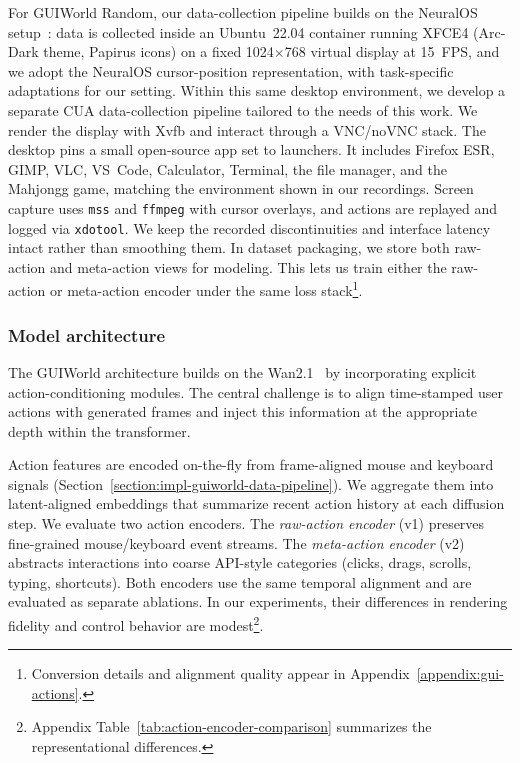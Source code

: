 For GUIWorld Random, our data-collection pipeline builds on the NeuralOS setup~\citep{rivard2025neuralos}: data is collected inside an Ubuntu~22.04 container running XFCE4 (Arc-Dark theme, Papirus icons) on a fixed 1024$\times$768 virtual display at 15~FPS, and we adopt the NeuralOS cursor-position representation, with task-specific adaptations for our setting.
Within this same desktop environment, we develop a separate CUA data-collection pipeline tailored to the needs of this work.
We render the display with Xvfb and interact through a VNC/noVNC stack.
The desktop pins a small open-source app set to launchers.
It includes Firefox ESR, GIMP, VLC, VS~Code, Calculator, Terminal, the file manager, and the Mahjongg game, matching the environment shown in our recordings.
Screen capture uses \texttt{mss} and \texttt{ffmpeg} with cursor overlays, and actions are replayed and logged via \texttt{xdotool}.
We keep the recorded discontinuities and interface latency intact rather than smoothing them.
In dataset packaging, we store both raw-action and meta-action views for modeling.
This lets us train either the raw-action or meta-action encoder under the same loss stack\footnote{Conversion details and alignment quality appear in Appendix~\ref{appendix:gui-actions}.}.

\subsubsection{Model architecture}

The GUIWorld architecture builds on the Wan2.1~\citep{wan2025wan} by incorporating explicit action-conditioning modules.
The central challenge is to align time-stamped user actions with generated frames and inject this information at the appropriate depth within the transformer.

Action features are encoded on-the-fly from frame-aligned mouse and keyboard signals (Section~\ref{section:impl-guiworld-data-pipeline}).
We aggregate them into latent-aligned embeddings that summarize recent action history at each diffusion step.
We evaluate two action encoders.
The \emph{raw-action encoder} (v1) preserves fine-grained mouse/keyboard event streams.
The \emph{meta-action encoder} (v2) abstracts interactions into coarse API-style categories (clicks, drags, scrolls, typing, shortcuts).
Both encoders use the same temporal alignment and are evaluated as separate ablations.
In our experiments, their differences in rendering fidelity and control behavior are modest\footnote{Appendix Table~\ref{tab:action-encoder-comparison} summarizes the representational differences.}.

